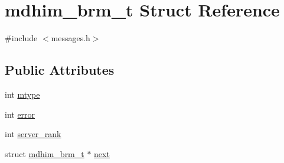 \hypertarget{structmdhim__brm__t}{\section{mdhim\-\_\-brm\-\_\-t Struct Reference}
\label{structmdhim__brm__t}
}


{\ttfamily \#include $<$messages.\-h$>$}

\subsection*{Public Attributes}
\begin{DoxyCompactItemize}
\item 
int \hyperlink{structmdhim__brm__t_abec78e9a1df09e0c2895c51edcacf59e}{mtype}
\item 
int \hyperlink{structmdhim__brm__t_ae52738aa96be251a3565ba89b11364f4}{error}
\item 
int \hyperlink{structmdhim__brm__t_a909ab473a5cde03aac89c5ef6aabc7cd}{server\-\_\-rank}
\item 
struct \hyperlink{structmdhim__brm__t}{mdhim\-\_\-brm\-\_\-t} $\ast$ \hyperlink{structmdhim__brm__t_ae3a86c1cd3f91266fccf3a90dd5798d5}{next}
\end{DoxyCompactItemize}


